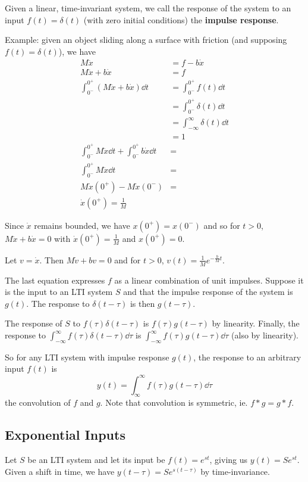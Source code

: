 \documentclass[12pt]{article}
\begin{document}
Given a linear, time-invariant system, we call the response of the system to an input $f(t) = \delta(t)$ (with zero initial conditions) the {\bf impulse response}.

Example: given an object sliding along a surface with friction (and supposing $f(t) = \delta(t)$), we have
\begin{align*}
M\ddot x &= f - b\dot x \\
M\ddot x + b\dot x &= f \\
\int_{0^-}^{0^+} (M\ddot x + b\dot x) \dd t &= \int_{0^-}^{0^+} f(t) \dd t \\
&= \int_{0^-}^{0^+} \delta(t) \dd t \\
&= \int_{-\infty}^{\infty} \delta(t) \dd t \\
&= 1 \\
\int_{0^-}^{0^+} M\ddot x \dd t + \int_{0^-}^{0^+} b\dot x\dd t &= \\
\int_{0^-}^{0^+} M\ddot x \dd t &= \\
M\dot x(0^+) - M\dot x(0^-) &= \\
\dot x(0^+) = \frac{1}{M}
\end{align*}

Since $\dot x$ remains bounded, we have $x(0^+) = x(0^-)$ and so for $t > 0$, $M\ddot x + b\dot x = 0$ with $\dot x(0^+) = \frac{1}{M}$ and $x(0^+) = 0$.

Let $v = \dot x$. Then $M\dot v + bv = 0$ and for $t > 0$, $v(t) = \frac{1}{M} e^{-\frac{b}{M} t}$.


The last equation expresses $f$ as a linear combination of unit impulses. Suppose it is the input to an LTI system $S$ and that the impulse response of the system is $g(t)$. The response to $\delta(t-\tau)$ is then $g(t-\tau)$.

The response of $S$ to $f(\tau)\delta(t-\tau)$ is $f(\tau)g(t-\tau)$ by linearity. Finally, the response to $\displaystyle\int_{-\infty}^\infty f(\tau)\delta(t-\tau) \dd\tau$ is $\displaystyle\int_{-\infty}^\infty f(\tau)g(t-\tau) \dd\tau$ (also by linearity).

So for any LTI system with impulse response $g(t)$, the response to an arbitrary input $f(t)$ is \[ y(t) = \int_{\infty}^\infty f(\tau)g(t-\tau) \dd\tau \] the convolution of $f$ and $g$. Note that convolution is symmetric, ie. $f * g = g * f$.

\subsection{Exponential Inputs}
Let $S$ be an LTI system and let its input be $f(t) = e^{st}$, giving us $y(t) = Se^{st}$. Given a shift in time, we have $y(t-\tau) = Se^{s(t-\tau)}$ by time-invariance.
\end{document}
